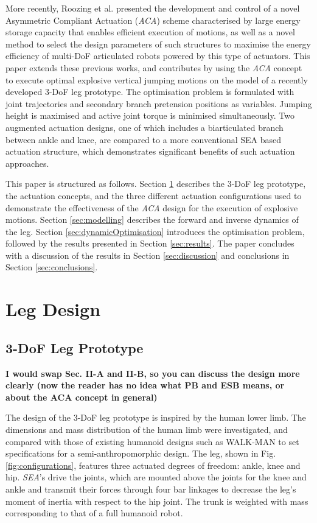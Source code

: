 \documentclass[letterpaper, 10 pt, conference]{ieeeconf}  %
\begin{document}
More recently, Roozing et al. \cite{roozing2016development, roozing2016design} presented the development and control of a novel Asymmetric Compliant Actuation (\textit{ACA}) scheme characterised by large energy storage capacity that enables efficient execution of motions, as well as a novel method to select the design parameters of such structures to maximise the energy efficiency of multi-DoF articulated robots powered by this type of actuators. This paper extends these previous works, and contributes by using the \textit{ACA} concept to execute optimal explosive vertical jumping motions on the model of a recently developed 3-DoF leg prototype. The optimisation problem is formulated with joint trajectories and secondary branch pretension positions as variables. Jumping height is maximised and active joint torque is minimised simultaneously. Two augmented actuation designs, one of which includes a biarticulated branch between ankle and knee, are compared to a more conventional SEA based actuation structure, which demonstrates significant benefits of such actuation approaches.

This paper is structured as follows. Section \ref{sec:legDesign} describes the 3-DoF leg prototype, the actuation concepts, and the three different actuation configurations used to demonstrate the effectiveness of the \textit{ACA} design for the execution of explosive motions. Section \ref{sec:modelling} describes the forward and inverse dynamics of the leg. Section \ref{sec:dynamicOptimisation} introduces the optimisation problem, followed by the results presented in Section \ref{sec:results}. The paper concludes with a discussion of the results in Section \ref{sec:discussion} and conclusions in Section \ref{sec:conclusions}.


\section{Leg Design}
\label{sec:legDesign}

\subsection{3-DoF Leg Prototype}
\textbf{I would swap Sec. II-A and II-B, so you can discuss the design more clearly (now the reader has no idea what PB and ESB means, or about the ACA concept in general)}

The design of the 3-DoF leg prototype is inspired by the human lower limb. The dimensions and mass distribution of the human limb were investigated, and compared with those of existing humanoid designs such as WALK-MAN \cite{tsagarakis2017walk} to set specifications for a semi-anthropomorphic design. The leg, shown in Fig. \ref{fig:configurations}, features three actuated degrees of freedom: ankle, knee and hip. \textit{SEA}'s drive the joints, which are mounted above the joints for the knee and ankle and transmit their forces through four bar linkages to decrease the leg’s moment of inertia with respect to the hip joint. The trunk is weighted with mass corresponding to that of a full humanoid robot.
\end{document}
